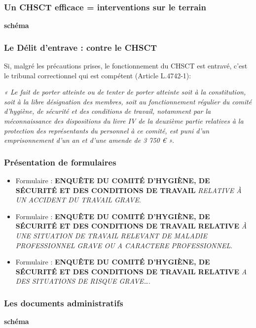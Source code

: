 \documentclass{beamer}
\begin{document}
\begin{frame}
\frametitle{Un CHSCT efficace = interventions sur le terrain}

\textbf{schéma}
\end{frame}


\begin{frame}
\frametitle{Le Délit d’entrave : contre le CHSCT}

Si, malgré les précautions prises, le fonctionnement du CHSCT est entravé, c'est le tribunal correctionnel qui est compétent (Article L.4742-1):

\textit{« Le fait de porter atteinte ou de tenter de porter atteinte soit à la constitution, soit à la libre désignation des membres, soit au fonctionnement régulier du comité d'hygiène, de sécurité et des conditions de travail, notamment par la méconnaissance des dispositions du livre IV de la deuxième partie relatives à la protection des représentants du personnel à ce comité, est puni d'un emprisonnement d'un an et d'une amende de 3 750 \euro{} ».}
\end{frame}

\begin{frame}
\frametitle{Présentation de formulaires}

\begin{itemize}
\item Formulaire : \textbf{ENQUÊTE DU COMITÉ D'HYGIÈNE, DE SÉCURITÉ ET DES CONDITIONS DE TRAVAIL} \textit{RELATIVE À UN ACCIDENT DU TRAVAIL GRAVE}.

\item Formulaire : \textbf{ENQUÊTE DU COMITÉ D'HYGIÈNE, DE SÉCURITÉ ET DES CONDITIONS DE TRAVAIL RELATIVE} \textit{À UNE SITUATION DE TRAVAIL RELEVANT DE MALADIE PROFESSIONNEL GRAVE OU A CARACTERE PROFESSIONNEL}.

\item Formulaire : \textbf{ENQUÊTE DU COMITÉ D'HYGIÈNE, DE SÉCURITÉ ET DES CONDITIONS DE TRAVAIL RELATIVE}  \textit{A DES SITUATIONS DE RISQUE GRAVE…}.
\end{itemize}
\end{frame}

\begin{frame}
\frametitle{Les documents administratifs}

\textbf{schéma}
\end{frame}
\end{document}
